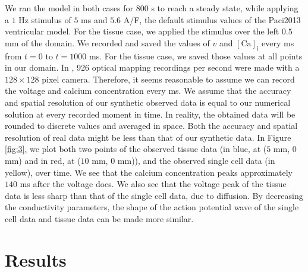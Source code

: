 \documentclass{article}
\begin{document}
We ran the model in both cases for 800 s to reach a steady state, while applying a $1$ Hz stimulus of $5$ ms and $5.6$ A/F, the default stimulus values of the Paci2013 ventricular model. For the tissue case, we applied the stimulus over the left $0.5$ mm of the domain. We recorded and saved the values of $v$ and $[\mathrm{Ca}]_{\mathrm{i}}$ every ms from $t=0$ to $t=1000$ ms. For the tissue case, we saved those values at all points in our domain. In \cite{Lee2012}, 926 optical mapping recordings per second were made with a $128 \times 128$ pixel camera. Therefore, it seems reasonable to assume we can record the voltage and calcium concentration every ms. We assume that the accuracy and spatial resolution of our synthetic observed data is equal to our numerical solution at every recorded moment in time. In reality, the obtained data will be rounded to discrete values and averaged in space. Both the accuracy and spatial resolution of real data might be less than that of our synthetic data. In Figure \ref{fig:3}, we plot both two points of the observed tissue data (in blue, at ($5$ mm, $0$ mm) and in red, at ($10$ mm, $0$ mm)), and the observed single cell data (in yellow), over time. We see that the calcium concentration peaks approximately $140$ ms after the voltage does. We also see that the voltage peak of the tissue data is less sharp than that of the single cell data, due to diffusion. By decreasing the conductivity parameters, the shape of the action potential wave of the single cell data and tissue data can be made more similar.
%
\section{Results} \label{Results}
\end{document}
